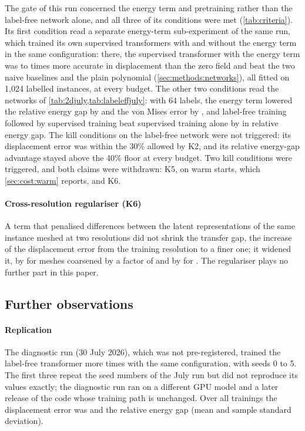 The gate of this run concerned the energy term and pretraining rather than the label-free
network alone, and all three of its conditions were met (\cref{tab:criteria}). Its first
condition read a separate energy-term sub-experiment of the same run, which trained its own
supervised transformers with and without the energy term in the same configuration: there,
the supervised transformer with the energy term was \numGOneSanityMin{} to
\numGOneSanityMax{} times more accurate in displacement than the zero field and beat the two
naive baselines and the plain polynomial (\cref{sec:methods:networks}), all fitted on 1,024
labelled instances, at every budget. The other two conditions read the networks of
\cref{tab:2djuly,tab:labeleffjuly}: with 64 labels, the energy term lowered the relative
energy gap by \numGOneGapReduction{} and the von Mises error by \numGOneVmReduction{}, and
label-free training followed by supervised training beat supervised training alone by
\numGOneFtGap{} in relative energy gap. The kill conditions on the label-free network were
not triggered: its displacement error was within the 30\% allowed by K2, and its relative
energy-gap advantage stayed above the 40\% floor at every budget. Two kill conditions were
triggered, and both claims were withdrawn: K5, on warm starts, which \cref{sec:cost:warm}
reports, and K6.

\paragraph{Cross-resolution regulariser (K6)}
A term that penalised differences between the latent representations of the same instance
meshed at two resolutions did not shrink the transfer gap, the increase of the
displacement error from the training resolution to a finer one; it widened it, by
\numCoarsenHighWiden{} for meshes coarsened by a factor of \numCoarsenHigh{} and by
\numCoarsenLowWiden{} for \numCoarsenLow{}. The regulariser plays no further part in this
paper.

\subsection{Further observations}\label{app:july:other}

\paragraph{Replication}
The diagnostic run (30 July 2026), which was not pre-registered, trained the label-free
transformer \numDiagSeeds{} more times with the same configuration, with seeds 0 to 5. The
first three repeat the seed numbers of the July run but did not reproduce its values
exactly; the diagnostic run ran on a different GPU model and a later release of the code
whose training path is unchanged. Over all \numTwoRuns{} trainings the displacement error
was \numTwoRunsDisp{} and the relative energy gap \numTwoRunsGap{} (mean and sample standard
deviation).

